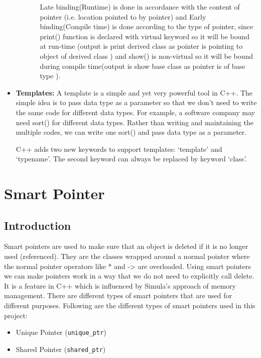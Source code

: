 \documentclass[main]{subfiles}
\begin{document}
\begin{itemize}
\begin{enumerate}
\begin{itemize}
            Late binding(Runtime) is done in accordance with the content of pointer (i.e. location pointed to by pointer) and Early binding(Compile time) is done according to the type of pointer, since print() function is declared with virtual keyword so it will be bound at run-time (output is print derived class as pointer is pointing to object of derived class ) and show() is non-virtual so it will be bound during compile time(output is show base class as pointer is of base type ).
        \end{itemize}
    \end{enumerate}
    \item\textbf{Templates:} A template is a simple and yet very powerful tool in C++. The simple idea is to pass data type as a parameter so that we don’t need to write the same code for different data types. For example, a software company may need sort() for different data types. Rather than writing and maintaining the multiple codes, we can write one sort() and pass data type as a parameter.
        
    C++ adds two new keywords to support templates: ‘template’ and ‘typename’. The second keyword can always be replaced by keyword ‘class’.
        
\end{itemize}


\section{Smart Pointer}
\subsection{Introduction}
Smart pointers are used to make sure that an object is deleted if it is no longer used (referenced). They are the classes wrapped around a normal pointer where the normal pointer operators like * and -> are overloaded. Using smart pointers we can make pointers work in a way that we do not need to explicitly call delete. It is a feature in C++ which is influenced by Simula's approach of memory management\cite{smart_pointers_cppref}. There are different types of smart pointers that are used for different purposes. Following are the different types of smart pointers used in this project:
\begin{itemize}
    \item Unique Pointer (\texttt{unique\_ptr})
    \item Shared Pointer (\texttt{shared\_ptr})
\end{itemize}
\end{document}

